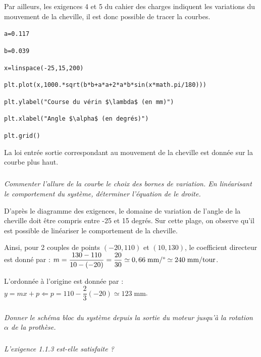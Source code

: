 \documentclass[10pt,fleqn]{article} %
\begin{document}
\begin{multicols}{2}
\begin{corrige}
Par ailleurs, les exigences 4 et 5 du cahier des charges indiquent les variations du mouvement de la cheville, il est donc possible de tracer la courbes.


\texttt{a=0.117}

\texttt{b=0.039}

\texttt{x=linspace(-25,15,200)}

\texttt{plt.plot(x,1000.*sqrt(b*b+a*a+2*a*b*sin(x*math.pi/180)))}

\texttt{plt.ylabel("Course du vérin \$\textbackslash  lambda\$ (en mm)")}

\texttt{plt.xlabel("Angle \$\textbackslash alpha\$ (en degrés)")}

\texttt{plt.grid()}
\end{corrige}

\else
\fi

\ifprof
\else
\vspace{.5cm}

La loi entrée sortie correspondant au mouvement de la cheville est donnée sur la courbe plus haut.


\fi

\subparagraph{}
\textit{Commenter l'allure de la courbe le choix des bornes de variation. En linéarisant le comportement du système, déterminer l'équation de le droite.}

\ifprof
\begin{corrige}
D'après le diagramme des exigences, le domaine de variation de l'angle de la cheville doit être compris entre -25 et 15 degrés. Sur cette plage, on observe qu'il est possible de linéariser le comportement de la cheville. 

Ainsi, pour 2 couples de points $( -20,110)$ et $(10,130)$, le coefficient directeur est donné par :  $m=\dfrac{130-110}{10-(-20)} = \dfrac{20}{30}\simeq 0,66 \; \text{mm/\textdegree}\simeq 240 \; \text{mm/tour}$.
 
 L'ordonnée à l'origine est donnée par : 
 $y=m x+p \Leftarrow p = 110-\dfrac{2}{3} (-20) \simeq 123 \; \text{mm}$. 
\end{corrige}
\else
\fi


\subparagraph{}
\textit{Donner le schéma bloc du système depuis la sortie du moteur jusqu'à la rotation $\alpha$ de la prothèse.} 

\subparagraph{}
\textit{L'exigence 1.1.3 est-elle satisfaite ?}


\end{multicols}
\end{document}
